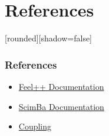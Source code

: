 \documentclass[10pt]{beamer}
\begin{document}
\section{References}
\begin{frame}
    [rounded][shadow=false]
    \frametitle{References}
    \begin{itemize}

        \item \href{https://docs.feelpp.org/user/latest/index.html}{Feel++ Documentation}
        
        \item \href{https://sciml.gitlabpages.inria.fr/scimba/}{ScimBa Documentation}

        \item \href{https://en.wikipedia.org/wiki/Coupling_(computer_programming)}{Coupling}
            
    \end{itemize}

\end{frame}
\end{document}
